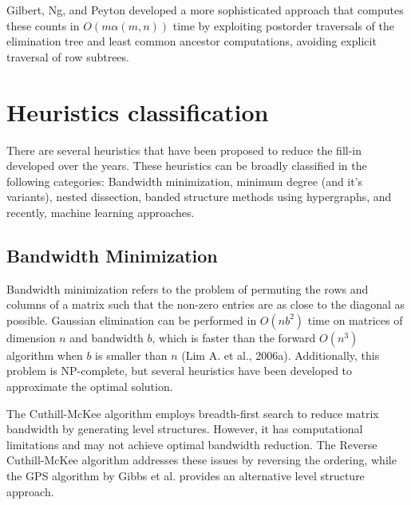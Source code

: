 Gilbert, Ng, and Peyton developed a more sophisticated approach that computes these counts in $O(m\alpha(m,n))$ time by exploiting postorder traversals of the elimination tree and least common ancestor computations, avoiding explicit traversal of row subtrees.




\section{Heuristics classification}
\label{sec:heuristics}

There are several heuristics that have been proposed to reduce the fill-in developed over the years. These heuristics can be broadly classified in the following categories: Bandwidth minimization, minimum degree (and it's variants), nested dissection, banded structure methods using hypergraphs, and recently, machine learning approaches. 

\subsection{Bandwidth Minimization}

Bandwidth minimization refers to the problem of permuting the rows and columns of a matrix such that the non-zero entries are as close to the diagonal as possible.  Gaussian elimination can be performed in $O(nb^2)$ time on matrices of dimension $n$ and bandwidth $b$, which is faster than the forward $O(n^3)$ algorithm when $b$ is smaller than $n$ (Lim A. et al., 2006a).  Additionally, this problem is NP-complete, but several heuristics have been developed to approximate the optimal solution.

The Cuthill-McKee algorithm employs breadth-first search to reduce matrix bandwidth by generating level structures. However, it has computational limitations and may not achieve optimal bandwidth reduction. The Reverse Cuthill-McKee algorithm addresses these issues by reversing the ordering, while the GPS algorithm by Gibbs et al. provides an alternative level structure approach.


